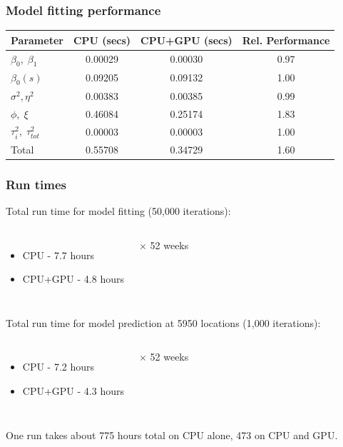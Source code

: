 \documentclass[t]{beamer}\usepackage[]{graphicx}\usepackage[]{color}
\begin{document}

\begin{frame}
\frametitle{Model fitting performance}

\begin{center}
\renewcommand*{\arraystretch}{1.5}
\begin{tabular}{l|c|c|c}
Parameter                 & CPU (secs) & CPU+GPU (secs)  & Rel. Performance \\
\hline           
$\beta_0, \; \beta_1$     & 0.00029    & 0.00030         & 0.97 \\
$\beta_0(s) $             & 0.09205    & 0.09132         & 1.00 \\
$\sigma^2,\eta^2$         & 0.00383    & 0.00385         & 0.99 \\
$\phi,\; \xi$             & 0.46084    & 0.25174         & 1.83 \\
$\tau^2_i,\; \tau^2_{tot}$& 0.00003    & 0.00003         & 1.00 \\
\hline
Total                     & 0.55708    & 0.34729         & 1.60
\end{tabular}
\end{center}

\end{frame}


\begin{frame}
\frametitle{Run times}

Total run time for model fitting (50,000 iterations): \\ \vspace{2mm}

\begin{columns}[c]
\begin{itemize}
\item CPU - 7.7 hours
\item CPU+GPU - 4.8 hours
\end{itemize}
$\times$ 52 weeks
\end{columns}


\vspace{7mm} \pause


Total run time for model prediction at 5950 locations (1,000 iterations): \\ \vspace{2mm}

\begin{columns}[c]
\begin{itemize}
\item CPU - 7.2 hours
\item CPU+GPU - 4.3 hours
\end{itemize}
$\times$ 52 weeks
\end{columns}

\vspace{7mm} \pause

One run takes about 775 hours total on CPU alone, 473 on CPU and GPU.

\end{frame}
\end{document}

